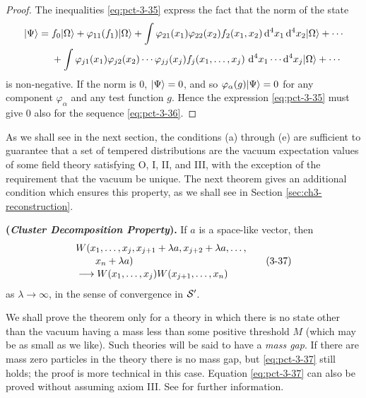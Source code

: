 \begin{proof}
The inequalities \eqref{eq:pct-3-35} express the fact that the norm of the state
\begin{align*}
 \lvert \Psi\rangle={}&f_0\lvert \Omega\rangle+\varphi_{11}(f_1)\lvert \Omega\rangle
 +\int\varphi_{21}(x_1)\varphi_{22}(x_2)f_2(x_1,x_2)
 \mathop{}\!\mathrm{d}^4x_1\mathop{}\!\mathrm{d}^4x_2\lvert \Omega\rangle+\cdots\\
 &+\int\varphi_{j1}(x_1)\varphi_{j2}(x_2)\cdots\varphi_{jj}(x_j)
 f_j(x_1,\ldots,x_j)\,\mathop{}\!\mathrm{d}^4x_1\cdots\mathop{}\!\mathrm{d}^4x_j\lvert \Omega\rangle+\cdots
\end{align*}
is non-negative. If the norm is 0, $\lvert \Psi\rangle=0$, and so
$\varphi_\alpha(g)\lvert \Psi\rangle=0$ for any component $\varphi_\alpha$ and any
test function $g$. Hence the expression \eqref{eq:pct-3-35} must give 0 also for the
sequence \eqref{eq:pct-3-36}.
\end{proof}

As we shall see in the next section, the conditions (a) through (e) are
sufficient to guarantee that a set of tempered distributions are the vacuum
expectation values of some field theory satisfying O, I, II, and III, with
the exception of the requirement that the vacuum be unique. The next theorem
gives an additional condition which ensures this property, as we shall see in
Section \ref{sec:ch3-reconstruction}.

\begin{theorem}\label{thm:ch3-4-cluster-decomposition}
\textbf{(\emph{Cluster Decomposition Property}).} If $a$ is a space-like
vector, then
\begin{equation}
 \begin{aligned}
  &W(x_1,\ldots,x_j,x_{j+1}+\lambda a,x_{j+2}+\lambda a,\ldots,\\[-2pt]
  &\qquad x_n+\lambda a)\\[-2pt]
  &\longrightarrow
  W(x_1,\ldots,x_j)W(x_{j+1},\ldots,x_n)
 \end{aligned}
\tag{3-37}\label{eq:pct-3-37}
\end{equation}
as $\lambda\to\infty$, in the sense of convergence in $\mathcal{S}'$.
\end{theorem}

\begin{pctremark}
We shall prove the theorem only for a theory in which there is no state other
than the vacuum having a mass less than some positive threshold $M$ (which may
be as small as we like). Such theories will be said to have a \emph{mass
gap}. If there are mass zero particles in the theory there is no mass gap,
but \eqref{eq:pct-3-37} still holds; the proof is more technical in this case. Equation
\eqref{eq:pct-3-37} can also be proved without assuming axiom III. See
\cite{pct-ch3-5,pct-ch3-7,pct-ch3-9,pct-ch3-10,pct-ch3-11} for further
information.
\end{pctremark}

